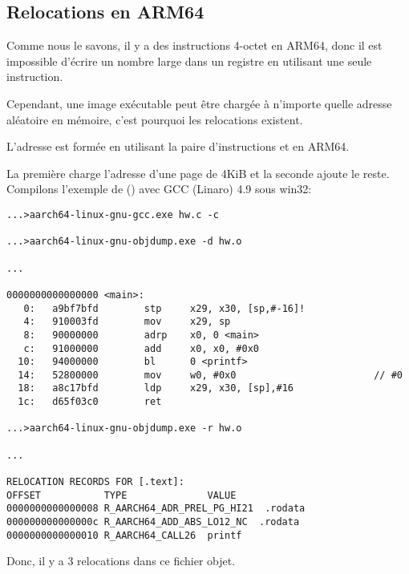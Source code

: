 ﻿\newcommand{\ARMELF}{\InSqBrackets{\emph{ELF for the ARM 64-bit Architecture (AArch64)}, (2013)}\footnote{\AlsoAvailableAs \url{http://go.yurichev.com/17288}}}

\subsection{Relocations en ARM64}
\label{ARM64_relocs}

Comme nous le savons, il y a des instructions 4-octet en ARM64, donc il est impossible
d'écrire un nombre large dans un registre en utilisant une seule instruction.

Cependant, une image exécutable peut être chargée à n'importe quelle adresse aléatoire
en mémoire, c'est pourquoi les relocations existent.


L'adresse est formée en utilisant la paire d'instructions  et \ADD en ARM64.

La première charge l'adresse d'une page de 4KiB et la seconde ajoute le reste.
Compilons l'exemple de \q{\HelloWorldSectionName} () avec GCC (Linaro)
4.9 sous win32:

\begin{lstlisting}[caption=GCC (Linaro) 4.9 et objdump du fichier objet,style=customasmARM]
...>aarch64-linux-gnu-gcc.exe hw.c -c

...>aarch64-linux-gnu-objdump.exe -d hw.o

...

0000000000000000 <main>:
   0:   a9bf7bfd        stp     x29, x30, [sp,#-16]!
   4:   910003fd        mov     x29, sp
   8:   90000000        adrp    x0, 0 <main>
   c:   91000000        add     x0, x0, #0x0
  10:   94000000        bl      0 <printf>
  14:   52800000        mov     w0, #0x0                        // #0
  18:   a8c17bfd        ldp     x29, x30, [sp],#16
  1c:   d65f03c0        ret

...>aarch64-linux-gnu-objdump.exe -r hw.o

...

RELOCATION RECORDS FOR [.text]:
OFFSET           TYPE              VALUE
0000000000000008 R_AARCH64_ADR_PREL_PG_HI21  .rodata
000000000000000c R_AARCH64_ADD_ABS_LO12_NC  .rodata
0000000000000010 R_AARCH64_CALL26  printf
\end{lstlisting}

Donc, il y a 3 relocations dans ce fichier objet.

